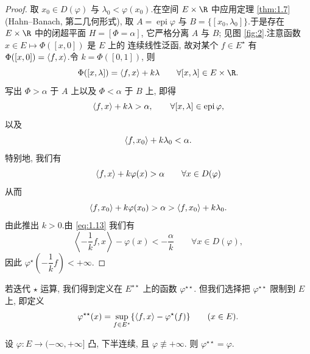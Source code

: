 \begin{proof}
取 $x_0\in D(\varphi)$ 与 $\lambda_0<\varphi(x_0)$.在空间 $E\times\R$ 中应用定理
 \ref{thm:1.7} (Hahn--Banach, 第二几何形式), 取 $A=\operatorname{epi}\varphi$ 与
$B=\{[x_0,\lambda_0]\}$.于是存在 $E\times\R$ 中的闭超平面 $H=[\Phi=\alpha]$,
它严格分离 $A$ 与 $B$; 见图  \ref{fig:2}.注意函数 $x\in E\mapsto\Phi([x,0])$ 是 $E$ 上的
连续线性泛函, 故对某个 $f\in E^\star$ 有 $\Phi([x,0])=\left\langle f,x\right\rangle$.令
$k=\Phi([0,1])$, 则
\begin{equation*}
\Phi([x,\lambda])=\dual{f}{x}+k\lambda\qquad \forall[x,\lambda]\in E\times\R.
\end{equation*}
写出 $\Phi>\alpha$ 于 $A$ 上以及 $\Phi<\alpha$ 于 $B$ 上, 即得
\begin{equation*}
\left\langle f,x\right\rangle+k\lambda>\alpha,\qquad \forall[x,\lambda]\in\operatorname{epi}\varphi,
\end{equation*}
以及
\begin{equation*}
\left\langle f,x_0\right\rangle+k\lambda_0<\alpha.
\end{equation*}
特别地, 我们有
\begin{equation}
\left\langle f,x\right\rangle+k\varphi(x)>\alpha\qquad \forall x\in D(\varphi)
  \label{eq:1.13}
\end{equation}
从而
\begin{equation*}
\left\langle f,x_0\right\rangle+k\varphi(x_0)>\alpha>\left\langle f,x_0\right\rangle+k\lambda_0.
\end{equation*}
由此推出 $k>0$.由 \eqref{eq:1.13} 我们有
\begin{equation*}
\left\langle-\frac{1}{k}f,x\right\rangle-\varphi(x)<-\frac{\alpha}{k}
\qquad \forall x\in D(\varphi),
\end{equation*}
因此 $\varphi^\star\!\left(-\dfrac{1}{k}f\right)<+\infty$.
\end{proof}

若迭代 $\star$ 运算, 我们得到定义在 $E^{\star\star}$ 上的函数 $\varphi^{\star\star}$.
但我们选择把 $\varphi^{\star\star}$ 限制到 $E$ 上, 即定义
\begin{equation*}
\varphi^{\star\star}(x)=\sup_{f\in E^\star}\{\left\langle f,x\right\rangle-\varphi^\star(f)\}
\qquad (x\in E).
\end{equation*}

\begin{keytheorem}
\label{thm:1.11}
设 $\varphi:E\to(-\infty,+\infty]$ 凸, 下半连续, 且 $\varphi\not\equiv+\infty$.
则 $\varphi^{\star\star}=\varphi$.
\end{keytheorem}

